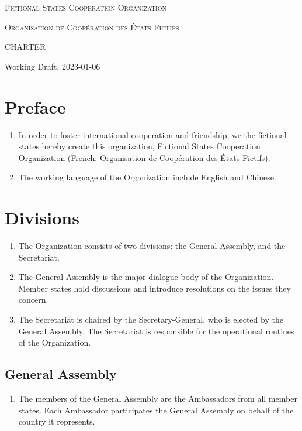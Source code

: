 \documentclass[11pt,a4paper]{article}
\begin{document}
\begin{minipage}{\linewidth}
	\parskip=12pt
	\center
	\large
	\textsc{Fictional States Cooperation Organization}

	\textsc{Organisation de Coopération des États Fictifs}

	\vskip 20pt

	\huge
	CHARTER

	\vskip 20pt
	\small
	Working Draft, 2023-01-06
\end{minipage}
\vskip 40pt



\section{Preface}
\begin{enumerate}
	\item In order to foster international cooperation and friendship, we the fictional states hereby create this organization,
	      Fictional States Cooperation Organization (French: Organisation de Coopération des États Fictifs).
	\item The working language of the Organization include English and Chinese.
\end{enumerate}


\section{Divisions}
\begin{enumerate}
	\item The Organization consists of two divisions: the General Assembly, and the Secretariat.
	\item The General Assembly is the major dialogue body of the Organization.
	      Member states hold discussions and introduce resolutions on the issues they concern.
	\item The Secretariat is chaired by the Secretary-General, who is elected by the General Assembly.
	      The Secretariat is responsible for the operational routines of the Organization.
\end{enumerate}

\subsection{General Assembly}
\begin{enumerate}
	\item The members of the General Assembly are the Ambassadors from all member states.
	      Each Ambassador participates the General Assembly on behalf of the country it represents.
\end{enumerate}
\end{document}
